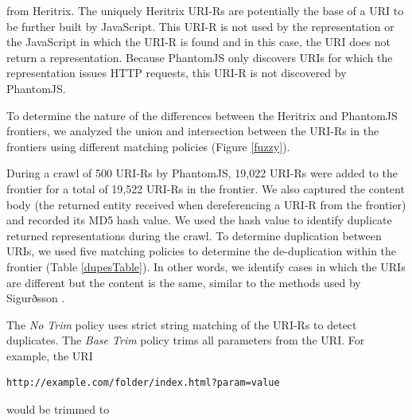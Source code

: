 \documentclass{ipres_proc_article-sp}
\begin{document}
\noindent from Heritrix. The uniquely Heritrix URI-Rs are potentially the base of a URI to be further built by JavaScript. This URI-R is not used by the representation or the JavaScript in which the URI-R is found and in this case, the URI does not return a representation. Because PhantomJS only discovers URIs for which the representation issues HTTP requests, this URI-R is not discovered by PhantomJS.

To determine the nature of the differences between the Heritrix and PhantomJS frontiers, we analyzed the union and intersection between the URI-Rs in the frontiers using different matching policies (Figure \ref{fuzzy}). %

During a crawl of 500 URI-Rs by PhantomJS, 19,022 URI-Rs were added to the frontier for a total of 19,522 URI-Rs in the frontier. We also captured the content body (the returned entity received when dereferencing a URI-R from the frontier) and recorded its MD5 hash value. We used the hash value to identify duplicate returned representations during the crawl. To determine duplication between URIs, we used five matching policies to determine the de-duplication within the frontier (Table \ref{dupesTable}). In other words, we identify cases in which the URIs are different but the content is the same, similar to the methods used by Sigurðsson \cite{uriDupes, uriDupes2}.

The \emph{No Trim} policy uses strict string matching of the URI-Rs to detect duplicates. The \emph{Base Trim} policy trims all parameters from the URI. For example, the URI 

\begin{verbatim}
http://example.com/folder/index.html?param=value 
\end{verbatim}

\noindent would be trimmed to 
\end{document}
